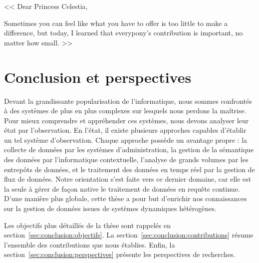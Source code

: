 \begin{savequote}[.5\textwidth]
<< Dear Princess Celestia,

\quad Sometimes you can feel like what you have to offer is too little to make a difference, but today, I learned that everypony's contribution is important, no matter how small. >>
\end{savequote}

\chapter{Conclusion et perspectives}\label{chap:conclusion}
\chaptertoc

Devant la grandissante popularisation de l'informatique, nous sommes confrontés à des systèmes de plus en plus complexes sur lesquels nous perdons la maîtrise. Pour mieux comprendre et appréhender ces systèmes, nous devons analyser leur état par l'observation. En l'état, il existe plusieurs approches capables d'établir un tel système d'observation. Chaque approche possède un avantage propre : la collecte de données par les systèmes d'administration, la gestion de la sémantique des données par l'informatique contextuelle, l'analyse de grands volumes par les entrepôts de données, et le traitement des données en temps réel par la gestion de flux de données. Notre orientation s'est faite vers ce dernier domaine, car elle est la seule à gérer de façon native le traitement de données en requête continue. D'une manière plus globale, cette thèse a pour but d'enrichir nos connaissances sur la gestion de données issues de systèmes dynamiques hétérogènes. 

Les objectifs plus détaillés de la thèse sont rappelés en section~\ref{sec:conclusion:objectifs}. La section~\ref{sec:conclusion:contributions} résume l'ensemble des contributions que nous établies. Enfin, la section~\ref{sec:conclusion:perspectives} présente les perspectives de recherches.





